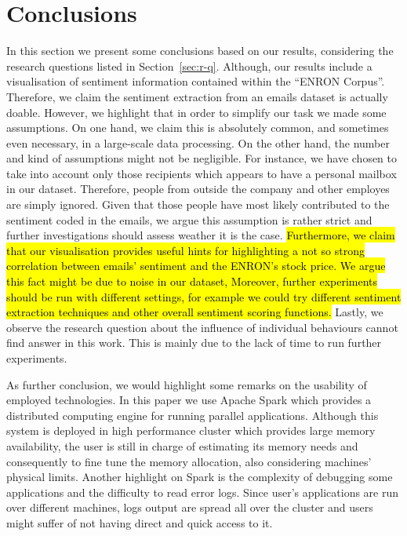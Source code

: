 \documentclass{vldb}
\newcommand{\hlc}[2][lightcyan]{{\sethlcolor{#1}\hl{#2}}}
\begin{document}
\section{Conclusions}
\label{sec:concl}
In this section we present some conclusions based on our results, considering the research questions listed in Section~\ref{sec:r-q}.
Although, our results include a visualisation of sentiment information contained within the ``ENRON Corpus''.
Therefore, we claim the sentiment extraction from an emails dataset is actually doable. 
However, we highlight that in order to simplify our task we made some assumptions.
On one hand, we claim this is absolutely common, and sometimes even necessary, in a large-scale data processing.
On the other hand, the number and kind of assumptions might not be negligible.
For instance, we have chosen to take into account only those recipients which appears to have a personal mailbox in our dataset.
Therefore, people from outside the company and other employes are simply ignored.
Given that those people have most likely contributed to the sentiment coded in the emails, we argue this assumption is rather strict and further investigations should assess weather it is the case.  
\hlc{Furthermore, we claim that our visualisation provides useful hints for highlighting a not so strong correlation between emails' sentiment and the ENRON's stock price.
We argue this fact might be due to noise in our dataset,
Moreover, further experiments should be run with different settings, for example we could try different sentiment extraction techniques and other overall sentiment scoring functions.}
Lastly, we observe the research question about the influence of individual behaviours cannot find answer in this work.
This is mainly due to the lack of time to run further experiments.

As further conclusion, we would highlight some remarks on the usability of employed technologies.
In this paper we use Apache Spark which provides a distributed computing engine for running parallel applications.
Although this system is deployed in high performance cluster which provides large memory availability, the user is still in charge of estimating its memory needs and consequently to fine tune the memory allocation, also considering machines' physical limits.
Another highlight on Spark is the complexity of debugging some applications and the difficulty to read error logs.
Since user's applications are run over different machines, logs output are spread all over the cluster and users might suffer of not having direct and quick access to it.
 
\end{document}
